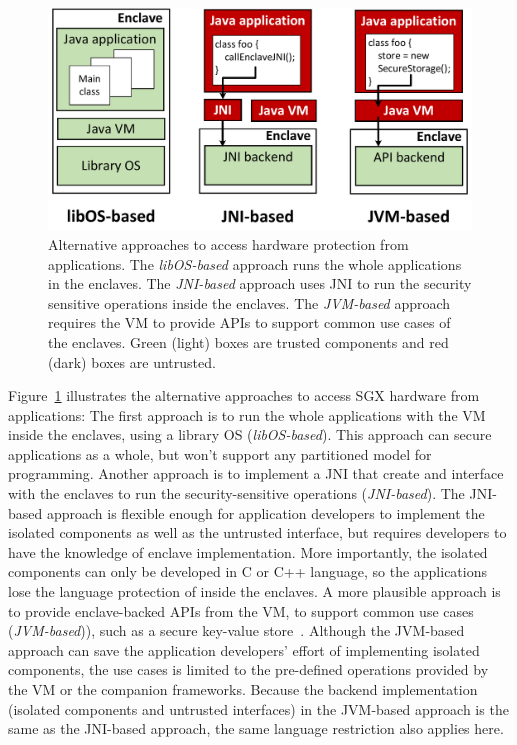 \begin{figure}[t!]
\centering
\includegraphics[width=\linewidth]{figures/alternatives.pdf}
\footnotesize
\caption{Alternative approaches to access \sgx{} hardware protection from \java{} applications.
The {\em libOS-based} approach runs the whole \java{} applications in the enclaves. 
The {\em JNI-based} approach uses JNI to run the security sensitive operations inside the enclaves.
The {\em JVM-based} approach requires the \java{} VM to provide APIs to support common use cases of the enclaves.
Green (light) boxes are trusted components and red (dark) boxes are untrusted.
}
\label{fig:alternatives}
\end{figure}


Figure~\ref{fig:alternatives} illustrates the alternative approaches
to access SGX hardware from \java{} applications:
The first approach is to run the whole \java{} applications with the \java{} VM inside the enclaves,
using a library OS ({\em libOS-based}).
This approach can secure applications as a whole,
but won't support any partitioned model for programming.
Another approach is to implement a JNI that create and interface with the enclaves
to run the security-sensitive operations ({\em JNI-based}).
The JNI-based approach is flexible enough for application developers
to implement the isolated components as well as the untrusted interface,
but requires developers to have the knowledge of
enclave implementation.
More importantly, the isolated components can only be developed in C or C++
language, so the applications lose the language protection of \java{} inside the enclaves.
A more plausible approach is to provide enclave-backed APIs
from the \java{} VM,
to support common use cases ({\em JVM-based})), such as a secure key-value store~\cite{vc3}.
Although the JVM-based approach can save the application developers' effort
of implementing isolated components,
the use cases is limited to the pre-defined operations provided by the \java{} VM or the companion frameworks.
Because the backend implementation (isolated components and untrusted interfaces) in the JVM-based approach is the same as the JNI-based approach,
the same language restriction also applies here. 

